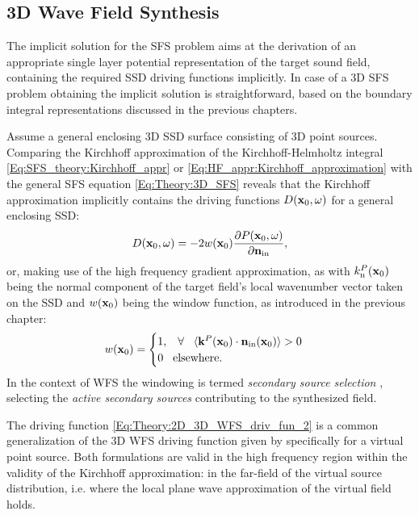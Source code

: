 \subsection{3D Wave Field Synthesis}

The implicit solution for the SFS problem aims at the derivation of an appropriate single layer potential representation of the target sound field, containing the required SSD driving functions implicitly.
In case of a 3D SFS problem obtaining the implicit solution is straightforward, based on the boundary integral representations discussed in the previous chapters.

Assume a general enclosing 3D SSD surface consisting of 3D point sources.
Comparing the Kirchhoff approximation of the Kirchhoff-Helmholtz integral \eqref{Eq:SFS_theory:Kirchhoff_appr} or \eqref{Eq:HF_appr:Kirchhoff_approximation} with the general SFS equation \eqref{Eq:Theory:3D_SFS} reveals that the Kirchhoff approximation implicitly contains the driving functions $D(\mathbf{x}_0,\omega)$ for a general enclosing SSD: 
\begin{equation}
D(\mathbf{x}_0,\omega) = - 2w(\mathbf{x}_0)\frac{\partial P(\mathbf{x}_0,\omega)}{\partial \mathbf{n}_{\mathrm{in}}}, 
\label{Eq:Theory:2D_3D_WFS_driv_fun}
\end{equation}
or, making use of the high frequency gradient approximation, as
with $k_{\mathrm{n}}^P(\mathbf{x}_0)$ being the normal component of the target field's local wavenumber vector taken on the SSD and $w(\mathbf{x}_0)$ being the window function, as introduced in the previous chapter:
\begin{equation}
w(\mathbf{x}_0) = \begin{cases}
                        1, \hspace{3mm} \forall \hspace{3mm} \langle \mathbf{k}^P(\mathbf{x}_0) \cdot \mathbf{n}_{\text{in}}(\mathbf{x}_0) \rangle > 0 \\
                        0  \hspace{3mm} \text{elsewhere}.
                    \end{cases}
\end{equation}
In the context of WFS the windowing is termed \emph{secondary source selection} \cite{nicol19993d, Spors2007:DAGA:SS_selection_criterion, Spors2007}, selecting the \emph{active secondary sources} contributing to the synthesized field.

The driving function \eqref{Eq:Theory:2D_3D_WFS_driv_fun_2} is a common generalization of the 3D WFS driving function given by \cite[(20)]{Zotter2013:uniqueness} specifically for a virtual point source.
Both formulations are valid in the high frequency region within the validity of the Kirchhoff approximation: in the far-field of the virtual source distribution, i.e. where the local plane wave approximation of the virtual field holds.


